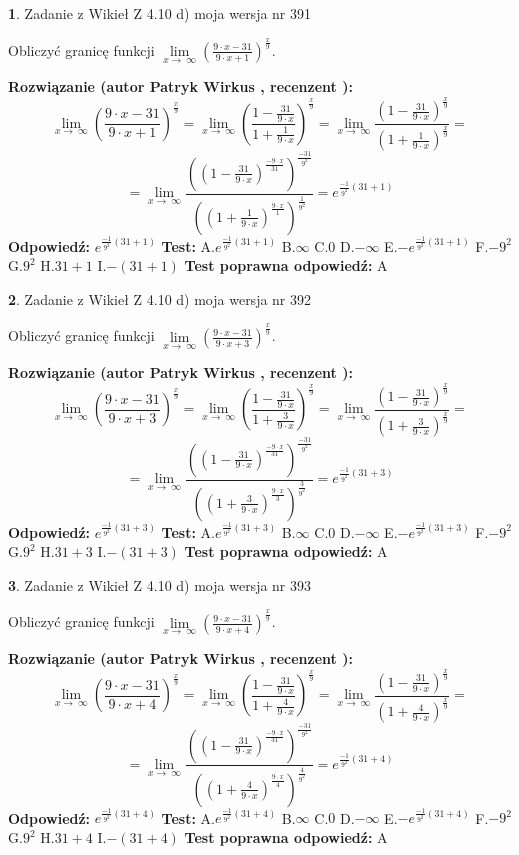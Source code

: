 \documentclass[12pt, a4paper]{article}
\theoremstyle{definition} %
\newtheorem{zad}{}
\newcommand{\zadStart}[1]{\begin{zad}#1\newline}
\newcommand{\zadStop}{\end{zad}}
\newcommand{\rozwStart}[2]{\noindent \textbf{Rozwiązanie (autor #1 , recenzent #2): }\newline}
\newcommand{\rozwStop}{\newline}
\newcommand{\odpStart}{\noindent \textbf{Odpowiedź:}\newline}
\newcommand{\odpStop}{\newline}
\newcommand{\testStart}{\noindent \textbf{Test:}\newline}
\newcommand{\testStop}{\newline}
\newcommand{\kluczStart}{\noindent \textbf{Test poprawna odpowiedź:}\newline}
\newcommand{\kluczStop}{\newline}
\begin{document}
\zadStart{Zadanie z Wikieł Z 4.10 d) moja wersja nr 391}


Obliczyć granicę funkcji  $\lim\limits_{x\to\ \infty}(\frac{9\cdot x-31}{9\cdot x+1})^{\frac{x}{9}}$.
\zadStop
\rozwStart{Patryk Wirkus}{}
$$\lim\limits_{x\to\ \infty}(\frac{9\cdot x-31}{9\cdot x+1})^{\frac{x}{9}} = \lim\limits_{x\to\ \infty}(\frac{1-\frac{31}{9\cdot x}}{1+\frac{1}{9\cdot x}})^{\frac{x}{9}}=\lim\limits_{x\to\ \infty}\frac{(1-\frac{31}{9\cdot x})^{\frac{x}{9}}}{(1+\frac{1}{9\cdot x})^{\frac{x}{9}}}=$$
$$=\lim\limits_{x\to\ \infty}\frac{((1-\frac{31}{9\cdot x})^{\frac{-9\cdot x}{31}})^{\frac{-31}{9^{2}}}}{((1+\frac{1}{9\cdot x})^{\frac{9\cdot x}{1}})^{\frac{1}{9^{2}}}}=e^{\frac{-1}{9^{2}}(31+1)}$$
\rozwStop
\odpStart
$e^{\frac{-1}{9^{2}}(31+1)}$
\odpStop
\testStart
A.$e^{\frac{-1}{9^{2}}(31+1)}$ B.$\infty$ C.$0$ D.$-\infty$ E.$-e^{\frac{-1}{9^{2}}(31+1)}$
F.$-9^{2}$ G.$9^{2}$
H.$31+1$
I.$-(31+1)$
\testStop
\kluczStart
A
\kluczStop



\zadStart{Zadanie z Wikieł Z 4.10 d) moja wersja nr 392}


Obliczyć granicę funkcji  $\lim\limits_{x\to\ \infty}(\frac{9\cdot x-31}{9\cdot x+3})^{\frac{x}{9}}$.
\zadStop
\rozwStart{Patryk Wirkus}{}
$$\lim\limits_{x\to\ \infty}(\frac{9\cdot x-31}{9\cdot x+3})^{\frac{x}{9}} = \lim\limits_{x\to\ \infty}(\frac{1-\frac{31}{9\cdot x}}{1+\frac{3}{9\cdot x}})^{\frac{x}{9}}=\lim\limits_{x\to\ \infty}\frac{(1-\frac{31}{9\cdot x})^{\frac{x}{9}}}{(1+\frac{3}{9\cdot x})^{\frac{x}{9}}}=$$
$$=\lim\limits_{x\to\ \infty}\frac{((1-\frac{31}{9\cdot x})^{\frac{-9\cdot x}{31}})^{\frac{-31}{9^{2}}}}{((1+\frac{3}{9\cdot x})^{\frac{9\cdot x}{3}})^{\frac{3}{9^{2}}}}=e^{\frac{-1}{9^{2}}(31+3)}$$
\rozwStop
\odpStart
$e^{\frac{-1}{9^{2}}(31+3)}$
\odpStop
\testStart
A.$e^{\frac{-1}{9^{2}}(31+3)}$ B.$\infty$ C.$0$ D.$-\infty$ E.$-e^{\frac{-1}{9^{2}}(31+3)}$
F.$-9^{2}$ G.$9^{2}$
H.$31+3$
I.$-(31+3)$
\testStop
\kluczStart
A
\kluczStop



\zadStart{Zadanie z Wikieł Z 4.10 d) moja wersja nr 393}


Obliczyć granicę funkcji  $\lim\limits_{x\to\ \infty}(\frac{9\cdot x-31}{9\cdot x+4})^{\frac{x}{9}}$.
\zadStop
\rozwStart{Patryk Wirkus}{}
$$\lim\limits_{x\to\ \infty}(\frac{9\cdot x-31}{9\cdot x+4})^{\frac{x}{9}} = \lim\limits_{x\to\ \infty}(\frac{1-\frac{31}{9\cdot x}}{1+\frac{4}{9\cdot x}})^{\frac{x}{9}}=\lim\limits_{x\to\ \infty}\frac{(1-\frac{31}{9\cdot x})^{\frac{x}{9}}}{(1+\frac{4}{9\cdot x})^{\frac{x}{9}}}=$$
$$=\lim\limits_{x\to\ \infty}\frac{((1-\frac{31}{9\cdot x})^{\frac{-9\cdot x}{31}})^{\frac{-31}{9^{2}}}}{((1+\frac{4}{9\cdot x})^{\frac{9\cdot x}{4}})^{\frac{4}{9^{2}}}}=e^{\frac{-1}{9^{2}}(31+4)}$$
\rozwStop
\odpStart
$e^{\frac{-1}{9^{2}}(31+4)}$
\odpStop
\testStart
A.$e^{\frac{-1}{9^{2}}(31+4)}$ B.$\infty$ C.$0$ D.$-\infty$ E.$-e^{\frac{-1}{9^{2}}(31+4)}$
F.$-9^{2}$ G.$9^{2}$
H.$31+4$
I.$-(31+4)$
\testStop
\kluczStart
A
\kluczStop
\end{document}
